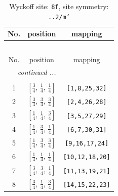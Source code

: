 \documentclass[fleqn,8pt]{jsarticle}
\begin{document}
\begin{longtable}{ccc}
\caption{Wyckoff site: {\tt 8f}, site symmetry: {\tt ..2/m'}}
 \\
 \hline \hline
No. & position & mapping \\ \hline \endfirsthead

\multicolumn{2}{l}{\tablename\ \thetable{}} \\
 \hline \hline
No. & position & mapping \\ \hline \endhead

 \hline \hline
\multicolumn{2}{r}{\footnotesize\it continued ...} \\ \endfoot

 \hline \hline
\multicolumn{2}{r}{} \\ \endlastfoot

1 & $\left[ \frac{3}{4},\, \frac{1}{4},\, \frac{1}{4} \right]$ & {\tt [1,8,25,32]} \\ \hline
2 & $\left[ \frac{3}{4},\, \frac{3}{4},\, \frac{3}{4} \right]$ & {\tt [2,4,26,28]} \\ \hline
3 & $\left[ \frac{1}{4},\, \frac{1}{4},\, \frac{3}{4} \right]$ & {\tt [3,5,27,29]} \\ \hline
4 & $\left[ \frac{1}{4},\, \frac{3}{4},\, \frac{1}{4} \right]$ & {\tt [6,7,30,31]} \\ \hline
5 & $\left[ \frac{1}{4},\, \frac{3}{4},\, \frac{3}{4} \right]$ & {\tt [9,16,17,24]} \\ \hline
6 & $\left[ \frac{1}{4},\, \frac{1}{4},\, \frac{1}{4} \right]$ & {\tt [10,12,18,20]} \\ \hline
7 & $\left[ \frac{3}{4},\, \frac{3}{4},\, \frac{1}{4} \right]$ & {\tt [11,13,19,21]} \\ \hline
8 & $\left[ \frac{3}{4},\, \frac{1}{4},\, \frac{3}{4} \right]$ & {\tt [14,15,22,23]} \\
\end{longtable}
\renewcommand{\arraystretch}{1.2}
\end{document}
